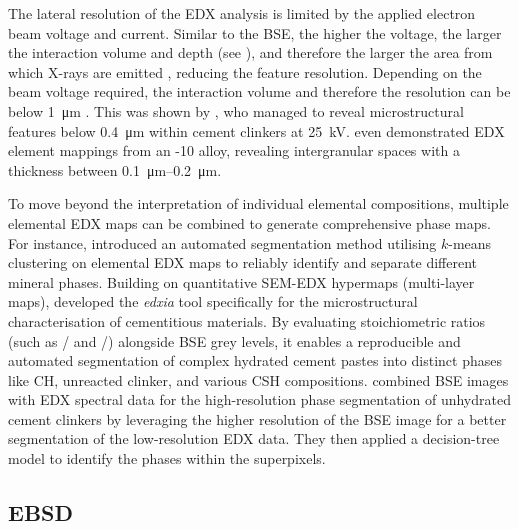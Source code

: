 The lateral resolution of the \ac{EDX} analysis is limited by the applied electron beam voltage and current.
Similar to the \ac{BSE}, the higher the voltage, the larger the interaction volume and depth (see ), and therefore the larger the area from which X-rays are emitted \cite{rossen.2017}, reducing the feature resolution.
Depending on the beam voltage required, the interaction volume and therefore the resolution can be below \qty{1}{\micro\meter} \cite{jiang.2022}.
This was shown by \textcite{rossler.2022}, who managed to reveal microstructural features below \qty{0.4}{\micro\meter} within cement clinkers at \qty{25}{\kilo\volt}.
\textcite{moeini.2021} even demonstrated \ac{EDX} element mappings from an -10 alloy, revealing intergranular spaces with a thickness between \qtyrange{0.1}{0.2}{\micro\meter}.

To move beyond the interpretation of individual elemental compositions, multiple elemental \ac{EDX} maps can be combined to generate comprehensive phase maps.
For instance, \textcite{munch.2015} introduced an automated segmentation method utilising $k$-means clustering on elemental \ac{EDX} maps to reliably identify and separate different mineral phases.
Building on quantitative \ac{SEM}-\ac{EDX} hypermaps (multi-layer maps), \textcite{georget.2021} developed the \textit{edxia} tool specifically for the microstructural characterisation of cementitious materials.
By evaluating stoichiometric ratios (such as / and /) alongside \ac{BSE} grey levels, it enables a reproducible and automated segmentation of complex hydrated cement pastes into distinct phases like \ac{CH}, unreacted clinker, and various \ac{CSH} compositions.
\textcite{jiang.2022} combined \ac{BSE} images with \ac{EDX} spectral data for the high-resolution phase segmentation of unhydrated cement clinkers by leveraging the higher resolution of the \ac{BSE} image for a better segmentation of the low-resolution \ac{EDX} data.
They then applied a decision-tree model to identify the phases within the superpixels.




\FloatBarrier

\subsection[Electron backscatter diffraction]{\Acl*{EBSD}}
\label{sec:ebsd}

